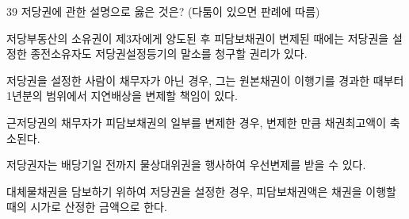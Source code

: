 \begin{question}{39}
저당권에 관한 설명으로 옳은 것은? (다툼이 있으면 판례에 따름)
\begin{choices}
  \item 저당부동산의 소유권이 제3자에게 양도된 후 피담보채권이 변제된 때에는 저당권을 설정한 종전소유자도 저당권설정등기의 말소를 청구할 권리가 있다.
  \item 저당권을 설정한 사람이 채무자가 아닌 경우, 그는 원본채권이 이행기를 경과한 때부터 1년분의 범위에서 지연배상을 변제할 책임이 있다.
  \item 근저당권의 채무자가 피담보채권의 일부를 변제한 경우, 변제한 만큼 채권최고액이 축소된다.
  \item 저당권자는 배당기일 전까지 물상대위권을 행사하여 우선변제를 받을 수 있다.
  \item 대체물채권을 담보하기 위하여 저당권을 설정한 경우, 피담보채권액은 채권을 이행할 때의 시가로 산정한 금액으로 한다.
\end{choices}
\end{question}
